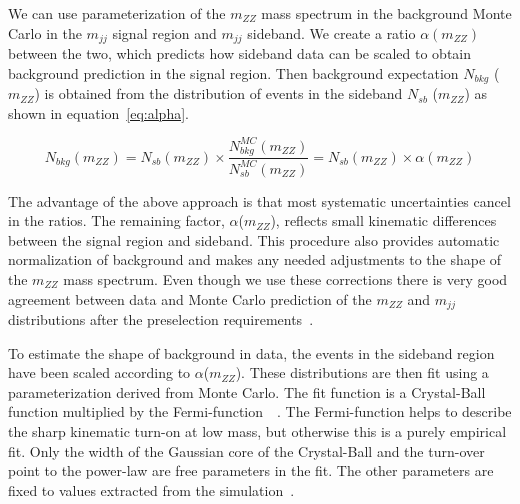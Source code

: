 We can use parameterization of the $m_{ZZ}$ mass spectrum in the background Monte Carlo in the $m_{jj}$ signal region and $m_{jj}$ sideband. We create a ratio $\alpha (m_{ZZ})$ between the two, which predicts how sideband data can be scaled to obtain background prediction in the signal region. Then background expectation $N_{bkg}$ ($m_{ZZ}$) is obtained from the distribution of events in the sideband $N_{sb}$ ($m_{ZZ}$) as shown in equation~\ref{eq:alpha}.

\begin{equation} N_{bkg}(m_{ZZ}) = N_{sb}(m_{ZZ}) \times \dfrac{N_{bkg}^{MC}(m_{ZZ})}{N_{sb}^{MC}(m_{ZZ})} = N_{sb}(m_{ZZ}) \times \alpha (m_{ZZ})      \label{eq:alpha}\end{equation} \vspace {.001em}



The advantage of the above approach is that most systematic uncertainties cancel in the ratios.  The remaining factor, $\alpha$($m_{ZZ}$), reflects small kinematic differences between the signal region and sideband. This procedure also provides automatic normalization of background and makes any needed adjustments to the shape of the $m_{ZZ}$ mass spectrum. Even though we use these corrections there is very good agreement between data and Monte Carlo prediction of the $m_{ZZ}$ and $m_{jj}$ distributions after the preselection requirements~\cite{CMS-AN-HIG-13-064}.

To estimate the shape of background in data, the events in the sideband region have been scaled according to $\alpha$($m_{ZZ}$). These distributions are then fit using a parameterization derived from Monte Carlo. The fit function is a Crystal-Ball function multiplied by the Fermi-function~\cite{CrystalBall}~\cite{FermiFunction}.  The Fermi-function helps to describe the sharp kinematic turn-on at low mass, but otherwise this is a purely empirical fit. Only the width of the Gaussian core of the Crystal-Ball and the turn-over point to the power-law are free parameters in the fit. The other parameters are fixed to values extracted from the simulation~\cite{AN-11-388}. 
